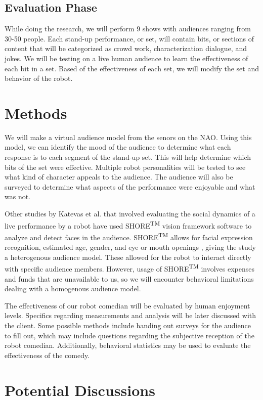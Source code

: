 \documentclass[onecolumn, draftclsnofoot,10pt, compsoc]{IEEEtran}
\begin{document}
\subsection{Evaluation Phase}
While doing the research, we will perform 9 shows with audiences ranging from 30-50 people. Each stand-up performance, or set, will contain bits, or sections of content that will be categorized as crowd work, characterization dialogue, and jokes. We will be testing on a live human audience to learn the effectiveness of each bit in a set. Based of the effectiveness of each set, we will modify the set and behavior of the robot.

\section{Methods}
We will make a virtual audience model from the senors on the NAO. Using this model, we can identify the mood of the audience to determine what each response is to each segment of the stand-up set. This will help determine which bits of the set were effective. Multiple robot personalities will be tested to see what kind of character appeals to the audience. The audience will also be surveyed to determine what aspects of the performance were enjoyable and what was not.


Other studies by Katevas et al. \cite{KatevasRobot:2014} that involved evaluating the social dynamics of a live performance by a robot have used SHORE\textsuperscript{TM} vision framework software to analyze and detect faces in the audience. SHORE\textsuperscript{TM} allows for facial expression recognition, estimated age, gender, and eye or mouth openings \cite{SHORE}, giving the study a heterogenous audience model. These allowed for the robot to interact directly with specific audience members. However, usage of SHORE\textsuperscript{TM} involves expenses and funds that are unavailable to us, so we will encounter behavioral limitations dealing with a homogenous audience model.

The effectiveness of our robot comedian will be evaluated by human enjoyment levels. Specifics regarding measurements and analysis will be later discussed with the client. Some possible methods include handing out surveys for the audience to fill out, which may include questions regarding the subjective reception of the robot comedian. Additionally, behavioral statistics may be used to evaluate the effectiveness of the comedy.

\section{Potential Discussions}
\end{document}
